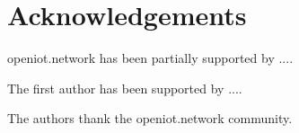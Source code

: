 \section*{Acknowledgements}

openiot.network has been partially supported by ....

The first author has been supported by ....

The authors thank the openiot.network community.


